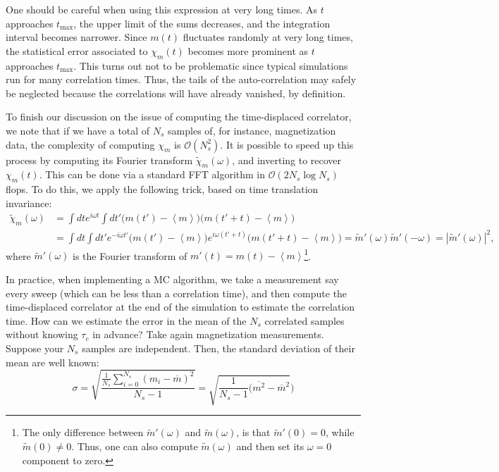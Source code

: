 One should be careful when using this expression at very long times.
As $t$ approaches $t_{\text{max}}$, the upper limit of the sums decreases, and the integration interval becomes narrower.
Since $m (t)$ fluctuates randomly at very long times, the statistical error associated to $\chi_m (t)$ becomes more prominent as $t$ approaches $t_{\text{max}}$.
This turns out not to be problematic since typical simulations run for many correlation times.
Thus, the tails of the auto-correlation may safely be neglected because the correlations will have already vanished, by definition.

To finish our discussion on the issue of computing the time-displaced correlator, we note that if we have a total of $N_s$ samples of, for instance, magnetization data, the complexity of computing $\chi_m$ is $\mathcal{O}(N_s^2)$.
It is possible to speed up this process by computing its Fourier transform $\tilde{\chi}_m(\omega)$, and inverting to recover $\chi_m (t)$.
This can be done via a standard \ac{FFT} algorithm in $\mathcal{O}(2 N_s \log N_s )$ flops.
To do this, we apply the following trick, based on time translation invariance:
\begin{equation}
\begin{split}
\tilde{\chi}_m ( \omega ) &= \int dt e^{i\omega t} \int dt' \bigg( m ( t' ) - \left\langle m \right\rangle \bigg) \bigg( m ( t' + t ) - \left\langle m \right\rangle \bigg) \\
&= \int dt \int dt' e^{-i\omega t'} \bigg( m ( t' ) - \left\langle m \right\rangle \bigg) e^{i\omega ( t' + t )} \bigg( m ( t' + t ) - \left\langle m \right\rangle \bigg) = \tilde{m}' (\omega) \tilde{m}' (- \omega) = | \tilde{m}' (\omega) |^2 ,
\end{split} 
\end{equation}
where $\tilde{m}' (\omega)$ is the Fourier transform of $m' (t) = m(t) - \left\langle m \right\rangle$\footnote{The only difference between $\tilde{m}' (\omega)$ and $\tilde{m} (\omega)$, is that $\tilde{m}' (0) = 0$, while $\tilde{m} (0) \neq 0$. Thus, one can also compute $\tilde{m} (\omega)$ and then set its $\omega = 0$ component to zero.}.

In practice, when implementing a MC algorithm, we take a measurement say every sweep (which can be less than a correlation time), and then compute the time-displaced correlator at the end of the simulation to estimate the correlation time.
How can we estimate the error in the mean of the $N_s$ correlated samples without knowing $\tau_c$ in advance?
Take again magnetization measurements.
Suppose your $N_s$ samples are independent.
Then, the standard deviation of their mean are well known:
\begin{equation}\label{eq:errorUncorr}
\sigma = \sqrt{ \frac{ \frac{1}{N_s} \sum_{i=0}^{N_s} ( m_i - \overline{m} )^2 }{N_s - 1} } = \sqrt{ \frac{1}{N_s - 1} ( \overline{m^2} - \overline{m}^2 } )
\end{equation}

